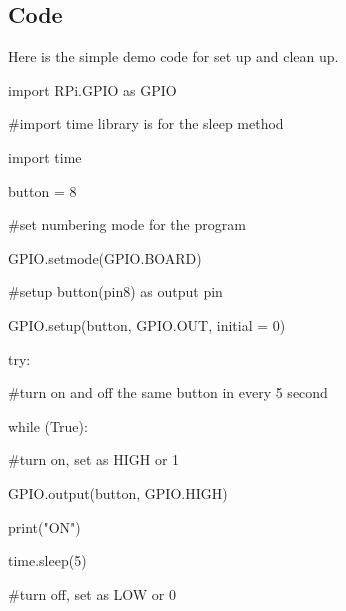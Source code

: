 \documentclass[onecolumn, draftclsnofoot,10pt, compsoc]{IEEEtran}
\begin{document}
\subsection{Code}
Here is the simple demo code \cite{r14} for set up and clean up.
\begin{flushleft}
import RPi.GPIO as GPIO
\end{flushleft}
\begin{flushleft}
\#import time library is for the sleep method
\end{flushleft}
\begin{flushleft}
import time
\end{flushleft}
\begin{flushleft}
button = 8
\end{flushleft}
\begin{flushleft}
\#set numbering mode for the program
\end{flushleft}
\begin{flushleft}
GPIO.setmode(GPIO.BOARD)
\end{flushleft}
\begin{flushleft}
\#setup button(pin8) as output pin
\end{flushleft}
\begin{flushleft}
GPIO.setup(button, GPIO.OUT, initial = 0)
\end{flushleft}
\begin{flushleft}
try:
\end{flushleft}
		\begin{flushleft}
    \quad \#turn on and off the same button in every 5 second
		\end{flushleft}
		\begin{flushleft}
    \quad while (True):
		\end{flushleft}
				\begin{flushleft}
        \quad \quad \#turn on, set as HIGH or 1
				\end{flushleft}
				\begin{flushleft}
				\quad \quad GPIO.output(button, GPIO.HIGH)
				\end{flushleft}
				\begin{flushleft}
				\quad \quad print("ON")
				\end{flushleft}
				\begin{flushleft}
				\quad \quad time.sleep(5)
				\end{flushleft}
				\begin{flushleft}
				\quad \quad \#turn off, set as LOW or 0
				\end{flushleft}
\end{document}
